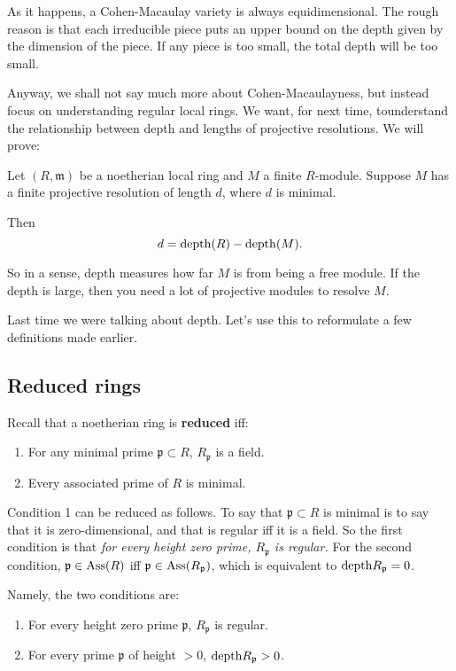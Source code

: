 As it happens, a Cohen-Macaulay variety is always
equidimensional. The rough
reason is that each irreducible piece puts an upper bound on the
depth given by
the dimension of the piece. If any piece is too small, the total
depth will be
too small.

Anyway, we shall not say much more about Cohen-Macaulayness, but
instead focus
on understanding regular local rings. We want, for next time,
tounderstand the relationship
between depth and lengths of projective resolutions.
We will prove:

\begin{theorem} Let $(R,
\mathfrak{m})$ be a
noetherian local ring and $M$ a finite $R$-module. Suppose $M$
has a finite
projective resolution of length $d$, where $d$ is minimal.

Then
\[ d = \mathrm{depth}(R) - \mathrm{depth}(M).  \]
\end{theorem}
So in a sense, depth measures how far $M$ is from being a free
module. If the
depth is large, then you need a lot of projective modules to
resolve $M$.

Last time we were talking about depth. Let's use this to
reformulate a few
definitions made earlier.

\subsection{Reduced rings}
Recall that a noetherian ring is \textbf{reduced} iff:
\begin{enumerate}
\item For any minimal prime $\mathfrak{p} \subset R$,
$R_{\mathfrak{p}}$ is a
field.
\item Every associated prime of $R$ is minimal.
\end{enumerate}

Condition 1 can be reduced as follows. To say that
$\mathfrak{p}\subset R$ is
minimal is to say that it is zero-dimensional, and that is
regular iff it is a
field. So the first condition is that \emph{for every height
zero prime,
$R_{\mathfrak{p}}$ is regular.} For the second condition,
$\mathfrak{p} \in
\operatorname{Ass}(R)$ iff $\mathfrak{p} \in \operatorname{Ass}(R_{\mathfrak{p}})$, which is
equivalent to
$\mathrm{depth} R_{\mathfrak{p}} = 0$.

Namely, the two conditions are:
\begin{enumerate}
\item For every height zero prime $\mathfrak{p} $,
$R_{\mathfrak{p}}$ is
regular.
\item For every prime $\mathfrak{p}$ of height $>0$, $\mathrm{depth}
R_{\mathfrak{p}} >
0$.
\end{enumerate}

